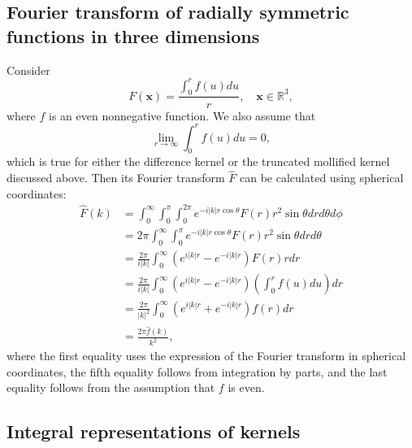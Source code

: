 \documentclass[final,letterpaper]{siamart171218}
\newcommand{\be}{\begin{equation}}
\newcommand{\ee}{\end{equation}}
\newcommand{\ba}{\begin{aligned}}
\newcommand{\ea}{\end{aligned}}
\newcommand{\x}{\boldsymbol{x}}
\begin{document}
\subsection{Fourier transform of radially symmetric functions in three dimensions}
Consider
\be
F(\x) = \frac{\int_0^{r} f(u)du}{r}, \quad \x\in \mathbb{R}^3,
\ee
where $f$ is an even nonnegative function. We also assume that
\be
\lim_{r\rightarrow \infty} \int_0^{r} f(u)du = 0,
\ee
which is true for either the difference kernel or
the truncated mollified kernel discussed above.
Then its Fourier transform $\widehat{F}$ can be calculated using spherical coordinates:
\be
\ba
\widehat{F}(k) &= 
\int_0^\infty \int_0^\pi \int_0^{2\pi} e^{-i|k| r \cos\theta}F(r) r^2 \sin\theta
drd\theta d\phi\\
&=2\pi \int_0^\infty \int_0^\pi e^{-i|k| r\cos\theta} F(r) r^2\sin\theta drd\theta\\
&=\frac{2\pi}{i|k|}\int_0^\infty \left(e^{i|k| r}-e^{-i|k| r}\right)
F(r) r dr\\
&= \frac{2\pi}{i|k|}\int_0^\infty \left(e^{i|k| r}-e^{-i|k| r}\right)
\left(\int_0^r f(u)du\right) dr\\
&= \frac{2\pi}{|k|^2}\int_0^\infty \left(e^{i|k| r}+e^{-i|k| r}\right)
f(r) dr\\
&= \frac{2\pi\hat{f}(k)}{k^2},
\ea
\ee
where the first equality uses the expression of the Fourier transform in spherical
coordinates, the fifth equality follows from integration by parts, and the last
equality follows from the assumption that $f$ is even.

\subsection{Integral representations of kernels}\label{sec:integralrepresentation}
\end{document}
